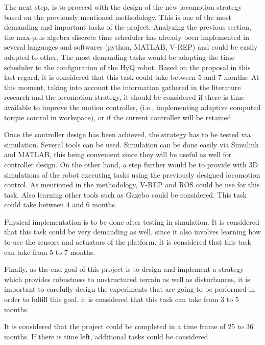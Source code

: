 \documentclass[main.tex]{subfiles}
\begin{document}
	The next step, is to proceed with the design of the new locomotion strategy based on the previously mentioned methodology. This is one of the most demanding and important tasks of the project. Analyzing the previous section, the max-plus algebra discrete time scheduler has already been implemented in several languages and softwares (python, MATLAB, V-REP) and could be easily adapted to other. The most demanding tasks would be adapting the time scheduler to the configuration of the HyQ robot. Based on the proposal in this last regard, it is considered that this task could take between 5 and 7 months. At this moment, taking into account the information gathered in the literature research and the locomotion strategy, it should be considered if there is time available to improve the motion controller, (i.e., implementing adaptive computed torque control in workspace), or if the current controller will be retained.
	
	Once the controller design has been achieved, the strategy has to be tested via simulation. Several tools can be used. Simulation can be done easily via Simulink and MATLAB, this being convenient since they will be useful as well for controller design. On the other hand, a step further would be to provide with 3D simulations of the robot executing tasks using the previously designed locomotion control. As mentioned in the methodology, V-REP and ROS could be use for this task. Also learning other tools such as Gazebo could be considered. This task could take between 4 and 6 months.
	
	Physical implementation is to be done after testing in simulation. It is considered that this task could be very demanding as well, since it also involves learning how to use the sensors and actuators of the platform. It is considered that this task can take from 5 to 7 months.
	
	Finally, as the end goal of this project is to design and implement a strategy which provides robustness to unstructured terrain as well as disturbances, it is important to carefully design the experiments that are going to be performed in order to fulfill this goal. it is considered that this task can take from 3 to 5 months.
	
	It is considered that the project could be completed in a time frame of 25 to 36 months. If there is time left, additional tasks could be considered.
\end{document}

